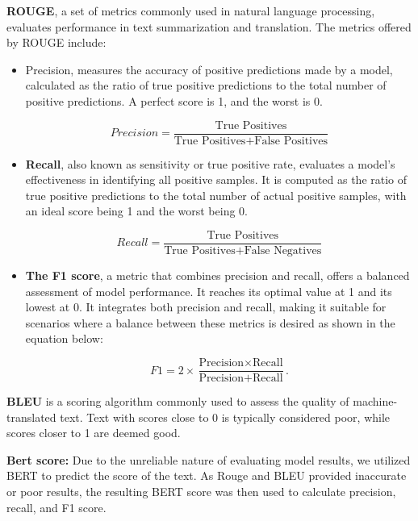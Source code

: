 \documentclass[fleqn,moreauthors,10pt]{ds_report}
\begin{document}
\textbf{ROUGE}, a set of metrics commonly used in natural language processing, evaluates performance in text summarization and translation. The metrics offered by ROUGE include:
\begin{itemize}
\item Precision, measures the accuracy of positive predictions made by a model, calculated as the ratio of true positive predictions to the total number of positive predictions. A perfect score is 1, and the worst is 0.

\setlength{\abovedisplayskip}{1pt}
\begin{equation}
	\label{eqn:Precision}
	Precision = \frac{\text{True Positives}}{\text{True Positives} + \text{False Positives}}
\end{equation}


\item \textbf{Recall}, also known as sensitivity or true positive rate, evaluates a model's effectiveness in identifying all positive samples. It is computed as the ratio of true positive predictions to the total number of actual positive samples, with an ideal score being 1 and the worst being 0.

\begin{equation}
	\label{eqn:Recall}
	Recall = \frac{\text{True Positives}}{\text{True Positives} + \text{False Negatives}}
\end{equation}

\item \textbf{The F1 score}, a metric that combines precision and recall, offers a balanced assessment of model performance. It reaches its optimal value at 1 and its lowest at 0. It integrates both precision and recall, making it suitable for scenarios where a balance between these metrics is desired as shown in the equation below:

\begin{equation}
	\label{eqn:F1}
	F1 = 2 \times \frac{\text{Precision} \times \text{Recall}}{\text{Precision} + \text{Recall}}.
\end{equation}

\end{itemize}

\textbf{BLEU} is a scoring algorithm commonly used to assess the quality of machine-translated text. Text with scores close to 0 is typically considered poor, while scores closer to 1 are deemed good.

\textbf{Bert score:} Due to the unreliable nature of evaluating model results, we utilized BERT to predict the score of the text. As Rouge and BLEU provided inaccurate or poor results, the resulting BERT score was then used to calculate precision, recall, and F1 score.
\end{document}
